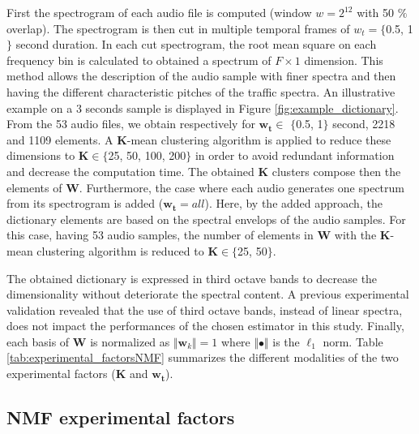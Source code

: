 \documentclass[review,5p,twocolumn,sort&compress,times]{elsarticle}
\begin{document}
First the spectrogram of each audio file is computed (window $w = 2^{12}$ with 50 $\%$ overlap). The spectrogram is then cut in multiple temporal frames of $w_t  = \lbrace$0.5, 1$\rbrace$ second duration. In each cut spectrogram, the root mean square on each frequency bin is calculated to obtained a spectrum of $F \times 1$ dimension. This method allows the description of the audio sample with finer spectra and then having the different characteristic pitches of the traffic spectra. An illustrative example on a 3 seconds sample is displayed in Figure \ref{fig:example_dictionary}. From the 53 audio files, we obtain respectively for $\mathbf{w_t}\in$ $\lbrace$0.5, 1$\rbrace$ second, 2218 and 1109 elements. A $\mathbf{K}$-mean clustering algorithm is applied to reduce these dimensions to $\mathbf{K} \in \lbrace$25, 50, 100, 200$\rbrace$ in order to avoid redundant information and decrease the computation time. The obtained $\mathbf{K}$ clusters compose then the elements of $\mathbf{W}$. Furthermore, the case where each audio generates one spectrum from its spectrogram is added ($\mathbf{w_t} = all$). Here, by the added approach, the dictionary elements are based on the spectral envelops of the audio samples. For this case, having 53 audio samples, the number of elements in $\mathbf{W}$ with the $\mathbf{K}$-mean clustering algorithm is reduced to $\mathbf{K} \in \lbrace$25, 50$\rbrace$.

The obtained dictionary is expressed in third octave bands to decrease the dimensionality without deteriorate the spectral content. A previous experimental validation revealed that the use of third octave bands, instead of linear spectra, does not impact the performances of the chosen estimator in this study.  Finally, each basis of $\mathbf{W}$ is normalized as $ \Vert \mathbf{w}_k \Vert = 1$ where $\Vert \bullet \Vert$ is the $\ell_1$ norm. Table \ref{tab:experimental_factorsNMF} summarizes the different modalities of the two experimental factors ($\mathbf{K}$ and $\mathbf{w_t}$).

\subsection{NMF experimental factors}
\end{document}
